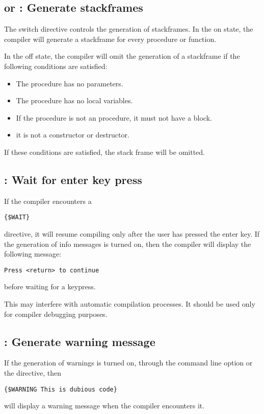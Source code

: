 \subsection{ or  : Generate stackframes}

The  switch directive controls the generation of stackframes.
In the on state, the compiler will generate a
stackframe for every procedure or function.

In the off state, the compiler will omit the generation of a stackframe if
the following conditions are satisfied:
\begin{itemize}
\item The procedure has no parameters.
\item The procedure has no local variables.
\item If the procedure is not an  procedure, it must not have
a  block.
\item it is not a constructor or destructor.
\end{itemize}
If these conditions are satisfied, the stack frame will be omitted.


\subsection{ : Wait for enter key press}

If the compiler encounters a
\begin{verbatim}
{$WAIT}
\end{verbatim}
directive, it will resume compiling only after the user has pressed the
enter key. If the generation of info messages is turned on, then the compiler
will display the following message:
\begin{verbatim}
Press <return> to continue
\end{verbatim}
before waiting for a keypress.
\begin{remark}
This may interfere with automatic compilation processes. 
It should be used only for compiler debugging purposes.
\end{remark}

\subsection{ : Generate warning message}

If the generation of warnings is turned on, through the 
command line option or the  directive, then
\begin{verbatim}
{$WARNING This is dubious code}
\end{verbatim}
will display a warning message when the compiler encounters it.

